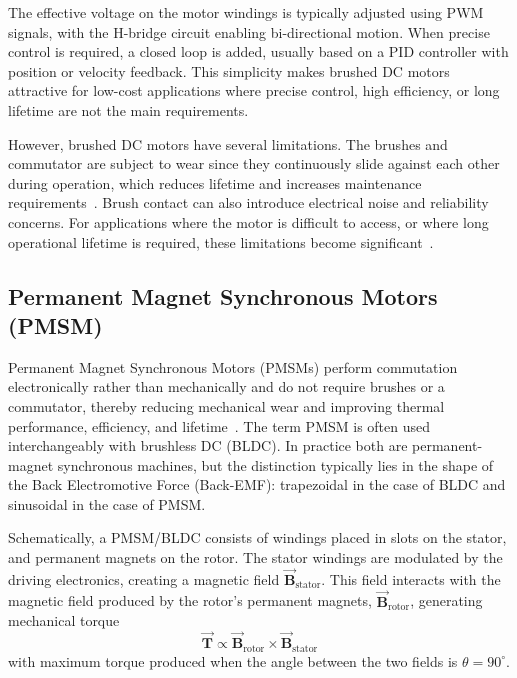 The effective voltage on the motor windings is typically adjusted using PWM signals, with the H-bridge circuit enabling bi-directional motion. When precise control is required, a closed loop is added, usually based on a PID controller with position or velocity feedback. This simplicity makes brushed DC motors attractive for low-cost applications where precise control, high efficiency, or long lifetime are not the main requirements.

However, brushed DC motors have several limitations. The brushes and commutator are subject to wear since they continuously slide against each other during operation, which reduces lifetime and increases maintenance requirements~\cite{microchip_an905}. Brush contact can also introduce electrical noise and reliability concerns. For applications where the motor is difficult to access, or where long operational lifetime is required, these limitations become significant~\cite{nasa_motor_selection}.

\subsection{Permanent Magnet Synchronous Motors (PMSM)}
\label{sec:bldc-motors}
Permanent Magnet Synchronous Motors (PMSMs) perform commutation electronically rather than mechanically and do not require brushes or a commutator, thereby reducing mechanical wear and improving thermal performance, efficiency, and lifetime~\cite{nasa_motor_selection}. The term PMSM is often used interchangeably with brushless DC (BLDC). In practice both are permanent-magnet synchronous machines, but the distinction typically lies in the shape of the Back Electromotive Force (Back-EMF): trapezoidal in the case of BLDC and sinusoidal in the case of PMSM.

Schematically, a PMSM/BLDC consists of windings placed in slots on the stator, and permanent magnets on the rotor. The stator windings are modulated by the driving electronics, creating a magnetic field $\boldsymbol{\vec{B}}_{\text{stator}}$. This field interacts with the magnetic field produced by the rotor's permanent magnets, $\boldsymbol{\vec{B}}_{\text{rotor}}$, generating mechanical torque
\begin{equation*}
    \boldsymbol{\vec{T}} \propto 
    \boldsymbol{\vec{B}}_{\text{rotor}} \times 
    \boldsymbol{\vec{B}}_{\text{stator}}
\end{equation*}
with maximum torque produced when the angle between the two fields is $\theta = 90^\circ$.

